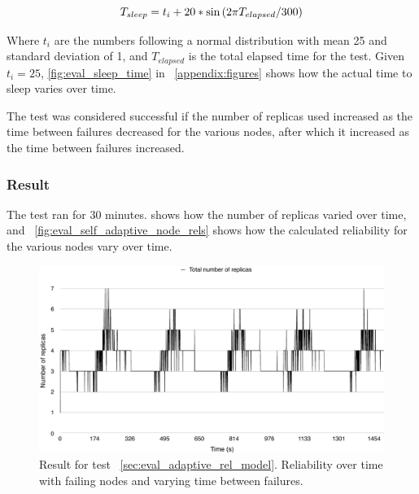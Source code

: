 \documentclass{cslthse-msc}
\begin{document}
\begin{equation} \label{eq:eval_sleep_time}
T_{sleep} = t_i + 20 * \sin{(2\*\pi\*T_{elapsed} / 300)}
\end{equation}

Where $t_i$ are the numbers following a normal distribution with mean 25 and standard deviation of 1, and $T_{elapsed}$ is the total elapsed time for the test. Given $t_i=25$, \cref{fig:eval_sleep_time} in ~\cref{appendix:figures} shows how the actual time to sleep varies over time.

The test was considered successful if the number of replicas used increased as the time between failures decreased for the various nodes, after which it increased as the time between failures increased.

\subsubsection*{Result}
The test ran for 30 minutes.  shows how the number of replicas varied over time, and ~\cref{fig:eval_self_adaptive_node_rels} shows how the calculated reliability for the various nodes vary over time. 

\begin{figure}[!hbt]
\centering
\includegraphics[scale=0.5]{images/results/self_adaptive_replicas.pdf}
\caption{Result for test ~\ref{sec:eval_adaptive_rel_model}. Reliability over time with failing nodes and varying time between failures.} \label{fig:eval_self_adaptive_rel}
\end{figure}
\end{document}
